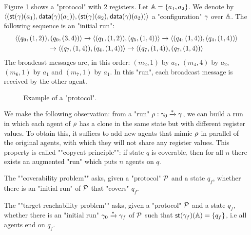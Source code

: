 \begin{example}\label{ex:example-1}
	Figure \ref{fig:ex1} shows a "protocol" with 2 registers. 
	Let $\mathbb{A} = \{a_1, a_2\}$. We denote by $\langle (\mathsf{st}(\gamma)(a_1), \mathsf{data}(\gamma)(a_1)), (\mathsf{st}(\gamma)(a_2),\mathsf{data}(\gamma)(a_2)) \rangle$ a "configuration" $\gamma$ over $\mathbb{A}$. The following sequence is an "initial run":
	\begin{multline*}
	\langle (q_0, (1,2)), (q_0,(3,4)) \rangle \xrightarrow{} \langle (q_1, (1,2)), (q_5,(1,4)) \rangle \xrightarrow{} 
	\langle (q_4, (1,4)), (q_4,(1,4)) \rangle \\ \xrightarrow{} \langle (q_7, (1,4)), (q_4,(1,4)) \rangle \xrightarrow{} \langle (q_7, (1,4)), (q_7,(1,4)) \rangle
	\end{multline*}
	The broadcast messages are, in this order: $(m_2,1)$ by $a_1$, $(m_4,4)$ by $a_2$, $(m_6,1)$ by $a_1$ and $(m_7,1)$ by $a_1$. In this "run", each broadcast message is received by the other agent. 
\end{example}

\begin{figure}[t]
	\centering
	\resizebox*{!}{3.2cm}{
		
	}
	\vspace{-0.2cm}
	\caption{Example of a "protocol".}\label{fig:ex1}
\end{figure}
	
	


\begin{remark}
	\label{rem:copycat-principle}
	We make the following observation: from a "run" $\rho : \gamma_0 \xrightarrow{\ast} \gamma$, we can build a run in which each agent of $\rho$ has  a clone in the same state but with different register values. To obtain this, it suffices to add new agents that mimic $\rho$ in parallel of the original agents, with which they will not share any register values.  This property is called ""copycat principle"": if state $q$ is coverable, then for all $n$ there exists an augmented "run" which puts $n$ agents on $q$.
\end{remark}

	
\begin{definition}

	\AP The ""coverability problem"" \COVER asks, given a "protocol" $\mathcal{P}$ and a state $q_f$, whether there is an "initial run" of $\mathcal{P}$ that "covers" $q_f$.
	
	\AP The ""target reachability problem"" \TARGET asks, given a "protocol" $\mathcal{P}$ and a state $q_f$, whether there is an "initial run" $\gamma_0 \xrightarrow{*} \gamma_f$ of $\mathcal{P}$ such that $\mathsf{st}(\gamma_f)(\mathbb{A}) = \{q_f\}$, i.e all agents end on $q_f$.
\end{definition}

